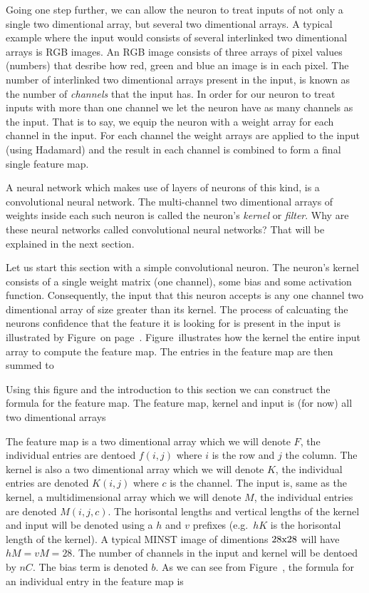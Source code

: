 Going one step further, we can allow the neuron to treat inputs of not only a single two dimentional array, but several two dimentional arrays.
A typical example where the input would consists of several interlinked two dimentional arrays is RGB images.
An RGB image consists of three arrays of pixel values (numbers) that desribe how red, green and blue an image is in each pixel.
The number of interlinked two dimentional arrays present in the input, is known as the number of {\em channels} that the input has.
In order for our neuron to treat inputs with more than one channel we let the neuron have as many channels as the input.
That is to say, we equip the neuron with a weight array for each channel in the input.
For each channel the weight arrays are applied to the input (using Hadamard) and the result in each channel is combined to form a final single feature map.

A neural network which makes use of layers of neurons of this kind, is a convolutional neural network.
The multi-channel two dimentional arrays of weights inside each such neuron is called the neuron's {\em kernel} or {\em filter}.
Why are these neural networks called convolutional neural networks?
That will be explained in the next section.

\startsubsection[title=The convolutional neuron]
Let us start this section with a simple convolutional neuron.
The neuron's kernel consists of a single weight matrix (one channel), some bias and some activation function.
Consequently, the input that this neuron accepts is any one channel two dimentional array of size greater than its kernel.
The process of calcuating the neurons  confidence that the feature it is looking for is present in the input is illustrated by Figure~ on page~.
Figure~ illustrates how the kernel  the entire input array to compute the feature map.
The entries in the feature map are then summed to 

Using this figure and the introduction to this section we can construct the formula for the feature map.
The feature map, kernel and input is (for now) all two dimentional arrays 


The feature map is a two dimentional array which we will denote $F$, the individual entries are dentoed $f(i,j)$ where $i$ is the row and $j$ the column.
The kernel is also a two dimentional array which we will denote $K$, the individual entries are denoted $K(i,j)$ where $c$ is the channel.
The input is, same as the kernel, a multidimensional array which we will denote $M$, the individual entries are denoted $M(i,j,c)$.
The horisontal lengths and vertical lengths of the kernel and input will be denoted using a $h$ and $v$ prefixes (e.g.\ $hK$ is the horisontal length of the kernel).
A typical MINST image of dimentions $28{\rm x}28$ will have $hM = vM = 28$.
The number of channels in the input and kernel will be dentoed by $nC$.
The bias term is denoted $b$.
As we can see from Figure~, the formula for an individual entry in the feature map is

